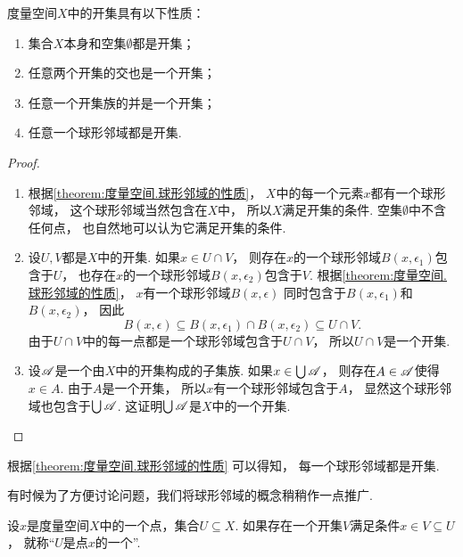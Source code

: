 \begin{theorem}\label{theorem:度量空间.开集的性质}
度量空间\(X\)中的开集具有以下性质：
\begin{enumerate}
	\item 集合\(X\)本身和空集\(\emptyset\)都是开集；
	\item 任意两个开集的交也是一个开集；
	\item 任意一个开集族的并是一个开集；
	\item 任意一个球形邻域都是开集.
\end{enumerate}
\begin{proof}
\begin{enumerate}
	\item 根据\cref{theorem:度量空间.球形邻域的性质}，
	\(X\)中的每一个元素\(x\)都有一个球形邻域，
	这个球形邻域当然包含在\(X\)中，
	所以\(X\)满足开集的条件.
	空集\(\emptyset\)中不含任何点，
	也自然地可以认为它满足开集的条件.

	\item 设\(U,V\)都是\(X\)中的开集.
	如果\(x \in U \cap V\)，
	则存在\(x\)的一个球形邻域\(B(x,\epsilon_1)\)包含于\(U\)，
	也存在\(x\)的一个球形邻域\(B(x,\epsilon_2)\)包含于\(V\).
	根据\cref{theorem:度量空间.球形邻域的性质}，
	\(x\)有一个球形邻域\(B(x,\epsilon)\)
	同时包含于\(B(x,\epsilon_1)\)和\(B(x,\epsilon_2)\)，
	因此\begin{equation*}
		B(x,\epsilon)
		\subseteq
		B(x,\epsilon_1) \cap B(x,\epsilon_2)
		\subseteq
		U \cap V.
	\end{equation*}
	由于\(U \cap V\)中的每一点都是一个球形邻域包含于\(U \cap V\)，
	所以\(U \cap V\)是一个开集.

	\item 设\(\mathscr{A}\)是一个由\(X\)中的开集构成的子集族.
	如果\(x \in \bigcup \mathscr{A}\)，
	则存在\(A \in \mathscr{A}\)使得\(x \in A\).
	由于\(A\)是一个开集，
	所以\(x\)有一个球形邻域包含于\(A\)，
	显然这个球形邻域也包含于\(\bigcup \mathscr{A}\).
	这证明\(\bigcup \mathscr{A}\)是\(X\)中的一个开集.
	\qedhere
\end{enumerate}
\end{proof}
\end{theorem}

根据\cref{theorem:度量空间.球形邻域的性质} 可以得知，
每一个球形邻域都是开集.

有时候为了方便讨论问题，我们将球形邻域的概念稍稍作一点推广.
\begin{definition}\label{definition:度量空间.邻域的概念}
设\(x\)是度量空间\(X\)中的一个点，集合\(U \subseteq X\).
如果存在一个开集\(V\)满足条件\(x \in V \subseteq U\)，
就称“\(U\)是点\(x\)的一个”.
\end{definition}

